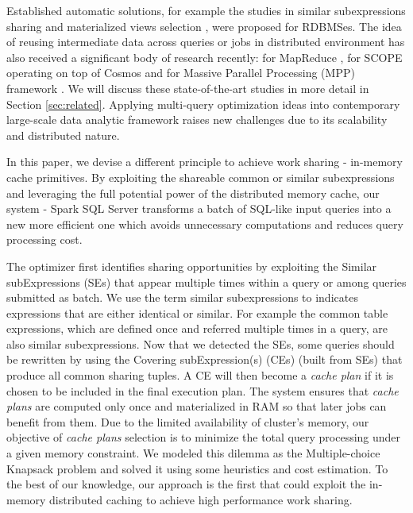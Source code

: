 Established automatic solutions, for example the studies in similar subexpressions sharing \cite{zhou2007efficient} and materialized views selection \cite{goldstein2001optimizing, mistry2001materialized}, were proposed for RDBMSes. The idea of reusing intermediate data across queries or jobs in distributed environment has also received a significant body of research  recently: for MapReduce \cite{mrshare, mqo}, for SCOPE operating on top of Cosmos \cite{silva2012exploiting} and for Massive Parallel Processing (MPP) framework \cite{el2015optimization}. We will discuss these state-of-the-art studies in more detail in Section \ref{sec:related}. Applying multi-query optimization ideas into contemporary large-scale data analytic framework raises new challenges due to its scalability and distributed nature.

In this paper, we devise a different principle to achieve work sharing - in-memory cache primitives. By exploiting the shareable common or similar subexpressions and leveraging the full potential power of the distributed memory cache, our system - Spark SQL Server transforms a batch of SQL-like input queries into a new more efficient one which avoids unnecessary computations and reduces query processing cost.

The optimizer first identifies sharing opportunities by exploiting the Similar subExpressions (SEs) that appear multiple times within a query or among queries submitted as batch. We use the term similar subexpressions to indicates expressions that are either identical or similar. For example the common table expressions, which are defined once and referred multiple times in a query, are also similar subexpressions. Now that we detected the SEs, some queries should be rewritten by using the Covering subExpression(s) (CEs) (built from SEs) that produce all common sharing tuples. A CE will then become a \emph{cache plan} if it is chosen to be included in the final execution plan. The system ensures that \emph{cache plans} are computed only once and materialized in RAM so that later jobs can benefit from them. Due to the limited availability of cluster's memory, our objective of \emph{cache plans} selection is to minimize the total query processing under a given memory constraint. We modeled this dilemma as the Multiple-choice Knapsack problem and solved it using some heuristics and cost estimation. To the best of our knowledge, our approach is the first that could exploit the in-memory distributed caching to achieve high performance work sharing.


